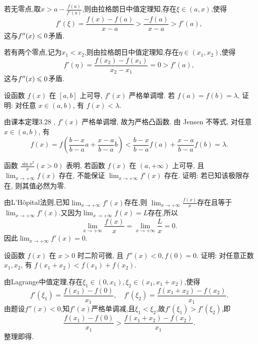 \begin{solution}
    若无零点,取$x > a - \frac{f(a)}{f'(a)}$,则由拉格朗日中值定理知,存在$\xi \in (a,x)$,使得
    $$f'(\xi) = \frac{f(x) - f(a)}{x - a} > \frac{-f(a)}{x - a} > f'(a),$$
    这与$f''(x) \leqslant 0$矛盾.

    若有两个零点,记为$x_1 < x_2$,则由拉格朗日中值定理知,存在$\eta \in (x_1,x_2)$,使得
    $$f'(\eta) = \frac{f(x_2) - f(x_1)}{x_2 - x_1} = 0 > f'(a),$$
    这与$f''(x) \leqslant 0$矛盾.
\end{solution}

\begin{exercise}[3.C.10]
    设函数 $f(x)$ 在 $[a, b]$ 上可导, $f'(x)$ 严格单调增. 若 $f(a) = f(b) = \lambda$, 证明: 对任意 $x \in (a, b)$, 有 $f(x) < \lambda$.
\end{exercise}

\begin{solution}
    由课本定理3.28 , $f'(x)$ 严格单调增, 故为严格凸函数. 由 Jensen 不等式, 对任意 $x \in (a, b)$, 有
    $$f(x) = f\left(\frac{b - x}{b - a} a + \frac{x - a}{b - a} b\right) < \frac{b - x}{b - a} f(a) + \frac{x - a}{b - a} f(b) = \lambda.$$
\end{solution}

\begin{exercise}[3.C.11]
    函数 $\frac{\sin x^2}{x} (x > 0)$ 表明, 若函数 $f(x)$ 在 $(a, +\infty)$ 上可导, 且 $\lim_{x \to +\infty} f(x)$ 存在, 不能保证 $\lim_{x \to +\infty} f'(x)$ 存在. 证明: 若已知该极限存在, 则其值必然为零.
\end{exercise}

\begin{solution}
    由L'Hôpital法则,已知$\lim_{x \to +\infty} f'(x)$存在,则
    $\lim_{x \to +\infty} \frac{f(x)}{x}$存在且等于$\lim_{x \to +\infty} f'(x)$.又因为$\lim_{x \to +\infty} f(x)=L$存在,所以
    $$\lim_{x \to +\infty} \frac{f(x)}{x} = \lim_{x \to +\infty} \frac{L}{x} = 0.$$
    因此$\lim_{x \to +\infty} f'(x) = 0$.
\end{solution}

\begin{exercise}[3.C.12]
    设函数 $f(x)$ 在 $x > 0$ 时二阶可微, 且 $f''(x) < 0, f(0) = 0$. 证明: 对任意正数 $x_1, x_2$, 有 $f(x_1 + x_2) < f(x_1) + f(x_2)$.
\end{exercise}

\begin{solution}
    由Lagrange中值定理,存在$\xi_1 \in (0,x_1), \xi_2 \in (x_1, x_1 + x_2)$,使得
    $$f'(\xi_1) = \frac{f(x_1) - f(0)}{x_1}, \quad f'(\xi_2) = \frac{f(x_1 + x_2) - f(x_2)}{x_1}.$$
    由题设$f''(x) < 0$,知$f'(x)$严格单调减,且$\xi_1 < \xi_2$,故$f'(\xi_1) > f'(\xi_2)$,即
    $$\frac{f(x_1) - f(0)}{x_1} > \frac{f(x_1 + x_2) - f(x_2)}{x_1}.$$
    整理即得.
\end{solution}

